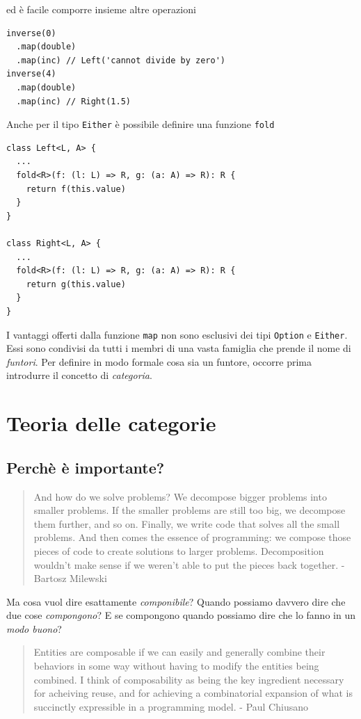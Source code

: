 \documentclass[12pt]{article}
\begin{document}
ed è facile comporre insieme altre operazioni

\begin{verbatim}
inverse(0)
  .map(double)
  .map(inc) // Left('cannot divide by zero')
inverse(4)
  .map(double)
  .map(inc) // Right(1.5)
\end{verbatim}

Anche per il tipo \texttt{Either} è possibile definire una funzione \texttt{fold}

\begin{verbatim}
class Left<L, A> {
  ...
  fold<R>(f: (l: L) => R, g: (a: A) => R): R {
    return f(this.value)
  }
}

class Right<L, A> {
  ...
  fold<R>(f: (l: L) => R, g: (a: A) => R): R {
    return g(this.value)
  }
}
\end{verbatim}

I vantaggi offerti dalla funzione \texttt{map} non sono esclusivi dei tipi \texttt{Option} e \texttt{Either}.
Essi sono condivisi da tutti i membri di una vasta famiglia che prende il nome di \emph{funtori}. Per definire in modo formale cosa sia un funtore,
occorre prima introdurre il concetto di \emph{categoria}.

\section{Teoria delle categorie}

\subsection{Perchè è importante?}

\begin{quote}
And how do we solve problems? We decompose bigger problems into smaller problems. If the smaller problems are still too big,
we decompose them further, and so on. Finally, we write code that solves all the small problems.
And then comes the essence of programming: we compose those pieces of code to create solutions to larger problems.
Decomposition wouldn’t make sense if we weren’t able to put the pieces back together. - Bartosz Milewski
\end{quote}

Ma cosa vuol dire esattamente \emph{componibile}? Quando possiamo davvero dire che due cose \emph{compongono}?
E se compongono quando possiamo dire che lo fanno in un \emph{modo buono}?\\

\begin{quote}
Entities are composable if we can easily and generally combine their behaviors in some way without having to modify the entities being combined.
I think of composability as being the key ingredient necessary for acheiving reuse, and for achieving a combinatorial expansion of
what is succinctly expressible in a programming model. - Paul Chiusano
\end{quote}
\end{document}
